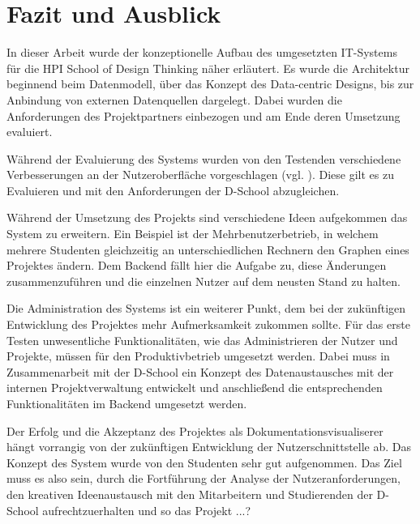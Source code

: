 \chapter{Fazit und Ausblick}
In dieser Arbeit wurde der konzeptionelle Aufbau des umgesetzten IT-Systems für die HPI School of Design Thinking näher erläutert. Es wurde die Architektur beginnend beim Datenmodell, über das Konzept des Data-centric Designs, bis zur Anbindung von externen Datenquellen dargelegt. Dabei wurden die Anforderungen des Projektpartners einbezogen und am Ende deren Umsetzung evaluiert.

Während der Evaluierung des Systems wurden von den Testenden verschiedene Verbesserungen an der Nutzeroberfläche vorgeschlagen (vgl. \cite{bp-tomh}). Diese gilt es zu Evaluieren und mit den Anforderungen der D-School abzugleichen.

Während der Umsetzung des Projekts sind verschiedene Ideen aufgekommen das System zu erweitern. Ein Beispiel ist der Mehrbenutzerbetrieb, in welchem mehrere Studenten gleichzeitig an unterschiedlichen Rechnern den Graphen eines Projektes ändern. Dem Backend fällt hier die Aufgabe zu, diese Änderungen zusammenzuführen und die einzelnen Nutzer auf dem neusten Stand zu halten.

Die Administration des Systems ist ein weiterer Punkt, dem bei der zukünftigen Entwicklung des Projektes mehr Aufmerksamkeit zukommen sollte. Für das erste Testen unwesentliche Funktionalitäten, wie das Administrieren der Nutzer und Projekte, müssen für den Produktivbetrieb umgesetzt werden. Dabei muss in Zusammenarbeit mit der D-School ein Konzept des Datenaustausches mit der internen Projektverwaltung entwickelt und anschließend die entsprechenden Funktionalitäten im Backend umgesetzt werden.

Der Erfolg und die Akzeptanz des Projektes als Dokumentationsvisualiserer hängt vorrangig von der zukünftigen Entwicklung der Nutzerschnittstelle ab. Das Konzept des System wurde von den Studenten sehr gut aufgenommen. Das Ziel muss es also sein, durch die Fortführung der Analyse der Nutzeranforderungen, den kreativen Ideenaustausch mit den Mitarbeitern und Studierenden der D-School aufrechtzuerhalten und so das Projekt ...?